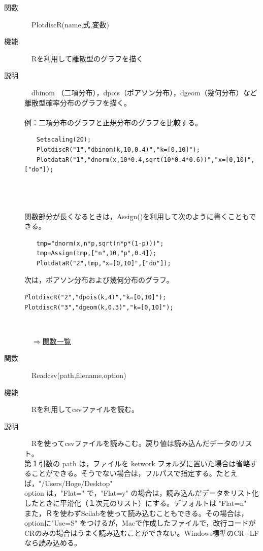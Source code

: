 \documentclass[papersize,a4paper,12pt,uplatex]{jsarticle}
\begin{document}
\begin{description}
\hypertarget{plotdiscr}{}
\item[関数]　PlotdiscR(name,式,変数)
\item[機能]　Rを利用して離散型のグラフを描く
\item[説明]　dbinom （二項分布），dpois（ポアソン分布），dgeom（幾何分布）など離散型確率分布のグラフを描く。\\
　\\
例：二項分布のグラフと正規分布のグラフを比較する。
\begin{verbatim}
　　Setscaling(20);
　　PlotdiscR("1","dbinom(k,10,0.4)","k=[0,10]");
　　PlotdataR("1","dnorm(x,10*0.4,sqrt(10*0.4*0.6))","x=[0,10]",["do"]);
\end{verbatim}
　\\
　　\\
　\\
関数部分が長くなるときは，Assign()を利用して次のように書くこともできる。
\begin{verbatim}
　　tmp="dnorm(x,n*p,sqrt(n*p*(1-p)))";
　　tmp=Assign(tmp,["n",10,"p",0.4]);
　　PlotdataR("2",tmp,"x=[0,10]",["do"]);
\end{verbatim}

次は，ポアソン分布および幾何分布のグラフ。
\begin{verbatim}
PlotdiscR("2","dpois(k,4)","k=[0,10]");
PlotdiscR("3","dgeom(k,0.3)","k=[0,10]");
\end{verbatim}
　\\
\begin{flushright}　\hyperlink{functionlist}{$\Rightarrow$関数一覧}\end{flushright}

\hypertarget{readcsv}{}
\item[関数]　Readcsv(path,filename,option)
\item[機能]　Rを利用してcsvファイルを読む。
\item[説明]　Rを使ってcsvファイルを読みこむ。戻り値は読み込んだデータのリスト。\\
第１引数の path は，ファイルを ketwork フォルダに置いた場合は省略することができる。そうでない場合は，フルパスで指定する。たとえば，"/Users/Hoge/Desktop"\\
option は，"Flat=" で，"Flat=y" の場合は，読み込んだデータをリスト化したときに平滑化（１次元のリスト）にする。デフォルトは "Flat=n"\\
また，Ｒを使わずScilabを使って読み込むこともできる。その場合は，optionに"Use=S" をつけるが，Macで作成したファイルで，改行コードがCRのみの場合はうまく読み込むことができない。Windows標準のCR+LFなら読み込める。


\end{description}
\end{document}
